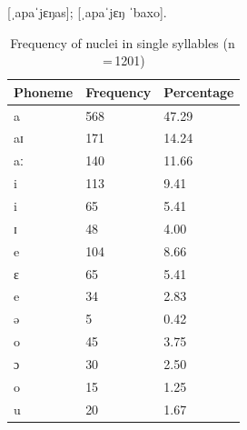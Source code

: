 \pex
	\a {} [ˌapaˈjɛŋas];
	\a {} [ˌapaˈjɛŋ ˈbaxo].
\xe

\begin{table}[pth]\centering
\caption[Frequency of nuclei in single syllables]{Frequency of nuclei in single 
syllables (n\,=\,1201)}
\begin{tabu} to 0.5\linewidth{X X[c] X[c]}
\tableheaderfont\toprule
Phoneme
	& Frequency
	& Percentage
	\\
	
\toprule

a
	& 568
	& 47.29\pct
	\\

aɪ
	& 171
	& 14.24\pct
	\\

aː
	& 140
	& 11.66\pct
	\\

\midrule

i
	& 113
	& 9.41\pct
	\\

\rowfont{\scriptsize\itshape}
\raggedleft
i
	& 65
	& 5.41\pct
	\\

\rowfont{\scriptsize\itshape}
\raggedleft
ɪ
	& 48
	& 4.00\pct
	\\

\midrule

e
	& 104
	& 8.66\pct
	\\

\rowfont{\scriptsize\itshape}
\raggedleft
ɛ
	& 65
	& 5.41\pct
	\\

\rowfont{\scriptsize\itshape}
\raggedleft
e
	& 34
	& 2.83\pct
	\\

\rowfont{\scriptsize\itshape}
\raggedleft
ə
	& 5
	& 0.42\pct
	\\

\midrule

o
	& 45
	& 3.75\pct
	\\

\rowfont{\scriptsize\itshape}
\raggedleft
ɔ
	& 30
	& 2.50\pct
	\\

\rowfont{\scriptsize\itshape}
\raggedleft
o
	& 15
	& 1.25\pct
	\\

\midrule

u
	& 20
	& 1.67\pct
	\\


\end{tabu}
\end{table}
